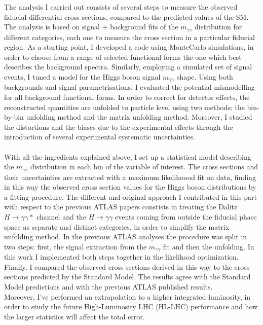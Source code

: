 The analysis I carried out consists of several steps to measure the observed fiducial differential cross sections, compared to the predicted values of the SM. The analysis is based on signal + background fits of the $m_{\gamma\gamma}$ distribution for different categories, each one to measure the cross section in a particular fiducial region. As a starting point, I developed a code using MonteCarlo simulations, in order to choose from a range of selected functional forms the one which best describes the background spectra. Similarly, employing a simulated set of signal events, I tuned a model for the Higgs boson signal $m_{\gamma\gamma}$ shape. Using both backgrounds and signal parametrisations, I evaluated the potential mismodelling for all background functional forms. In order to correct for detector effects, the reconstructed quantities are unfolded to particle level using two methods: the bin-by-bin unfolding method and the matrix unfolding method. Moreover, I studied the distortions and the biases due to the experimental effects through the introduction of several experimental systematic uncertainties.
\\\\
With all the ingredients explained above, I set up a statistical model describing the $m_{\gamma\gamma}$ distribution in each bin of the variable of interest. The cross sections and their uncertainties are extracted with a maximum likelihoood fit on data, finding in this way the observed cross section values for the Higgs boson distributions by a fitting procedure. The different and original approach I contributed in this part with respect to the previous ATLAS papers constists in treating the Dalitz $H \rightarrow \gamma\gamma *$ channel and the $H \rightarrow \gamma\gamma$ events coming from outside the fiducial phase space as separate and distinct categories, in order to simplify the matrix unfolding method. In the previous ATLAS analyses the procedure was split in two steps: first,  the signal extraction from the $m_{\gamma\gamma}$ fit and then the unfolding. In this work I implemented both steps together in the likelihood optimization. Finally, I compared the observed cross sections derived in this way to the cross sections predicted by the Standard Model. The results agree with the Standard Model predictions and with the previous ATLAS published results.
\\
Moreover, I've performed an extrapolation to a higher integrated luminosity, in order to study the future High-Luminosity LHC (HL-LHC) performance and how the larger statistics will affect the total error.
